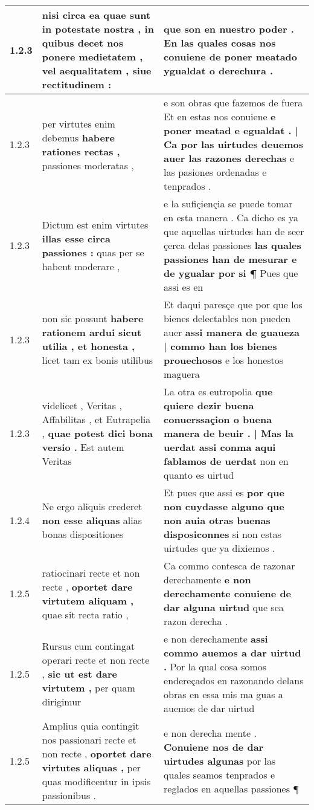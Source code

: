 \begin{tabular}{|p{1cm}|p{6.5cm}|p{6.5cm}|}
1.2.3 & nisi circa ea quae sunt in potestate nostra , \textbf{ in quibus decet nos ponere medietatem , } vel aequalitatem , siue rectitudinem : & que son en nuestro poder . \textbf{ En las quales cosas nos conuiene } de poner meatado ygualdat o derechura . \\\hline
1.2.3 & per virtutes enim debemus \textbf{ habere rationes rectas , } passiones moderatas , & e son obras que fazemos de fuera Et en estas nos conuiene \textbf{ e poner meatad e egualdat . | Ca por las uirtudes deuemos auer las razones derechas } e las pasiones ordenadas e tenprados . \\\hline
1.2.3 & Dictum est enim virtutes \textbf{ illas esse circa passiones : } quas per se habent moderare , & e la sufiçiençia se puede tomar en esta manera . Ca dicho es ya que aquellas uirtudes han de seer çerca delas passiones \textbf{ las quales passiones han de mesurar e de ygualar por si ¶ } Pues que assi es en \\\hline
1.2.3 & non sic possunt \textbf{ habere rationem ardui sicut utilia , et honesta , } licet tam ex bonis utilibus & Et daqui paresçe que por que los bienes delectables non pueden auer \textbf{ assi manera de guaueza | commo han los bienes prouechosos } e los honestos maguera \\\hline
1.2.3 & videlicet , Veritas , Affabilitas , et Eutrapelia , \textbf{ quae potest dici bona versio . } Est autem Veritas & La otra es eutropolia \textbf{ que quiere dezir buena conuerssaçion o buena manera de beuir . | Mas la uerdat assi conma aqui fablamos de uerdat } non en quanto es uirtud \\\hline
1.2.4 & Ne ergo aliquis crederet \textbf{ non esse aliquas } alias bonas dispositiones & Et pues que assi es \textbf{ por que non cuydasse alguno que non auia otras buenas disposiconnes } si non estas uirtudes que ya dixiemos . \\\hline
1.2.5 & ratiocinari recte et non recte , \textbf{ oportet dare virtutem aliquam , } quae sit recta ratio , & Ca commo contesca de razonar derechamente \textbf{ e non derechamente conuiene de dar alguna uirtud } que sea razon derecha . \\\hline
1.2.5 & Rursus cum contingat operari recte et non recte , \textbf{ sic ut est dare virtutem , } per quam dirigimur & e non derechamente \textbf{ assi commo auemos a dar uirtud . } Por la qual cosa somos endereçados en razonando delans obras en essa mis ma guas a auemos de dar uirtud \\\hline
1.2.5 & Amplius quia contingit nos passionari recte et non recte , \textbf{ oportet dare virtutes aliquas , } per quas modificentur in ipsis passionibus . & e non derecha mente . \textbf{ Conuiene nos de dar uirtudes algunas } por las quales seamos tenprados e reglados en aquellas passiones ¶ \\\hline

\end{tabular}
